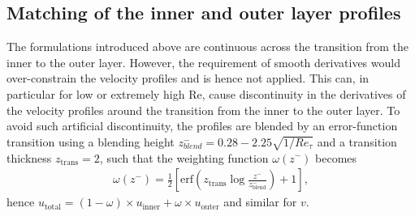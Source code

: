 \documentclass[smallcondensed,final]{svjour3}
\newcommand{\RE}{\mathrm{Re}}
\begin{document}
\subsection{Matching of the inner and outer layer profiles}
\label{sec:matching}
% 
The formulations introduced above are continuous across the transition from the inner to 
the outer layer. 
% 
However, the requirement of smooth derivatives would over-constrain the velocity profiles and is hence not applied. 
% 
This can, in particular for low or extremely high $\RE$, cause discontinuity in the derivatives of the velocity profiles around the transition from the inner to the outer layer. 
% 
To avoid such artificial discontinuity, the profiles are blended by an error-function transition using a blending 
height $z_{blend}^-=0.28-2.25\sqrt{1/Re_\tau}$ and a transition thickness 
$z_\text{trans}=2$, 
such that the weighting function $\omega(z^-)$ becomes 
\begin{align}
  \omega(z^-) = \frac12 \left[\text{erf}\left(z_\text{trans}\log\frac{z^-}{z_{\text{blend}}^{-}}\right) +1\right],
\end{align}
hence 
 $u_\text{total} = (1-\omega) \times u_\text{inner} + \omega \times u_\text{outer}$ and similar for $v$. 
\end{document}
